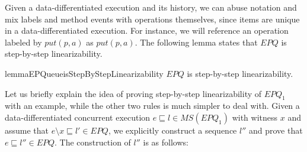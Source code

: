 Given a data-differentiated execution and its history, we can abuse notation and mix labels and method events with operations themselves, since items are unique in a data-differentiated execution. For instance, we will reference an operation labeled by $\textit{put}(p,a)$ as $\textit{put}(p,a)$. The following lemma states that $\textit{EPQ}$ is step-by-step linearizability.

\begin{restatable}{lemma}{EPQueueisStepByStepLinearizability}
\label{lemma:EPQ is step-by-step linearizability}
$\textit{EPQ}$ is step-by-step linearizability.
\end{restatable}

Let us briefly explain the idea of proving step-by-step linearizability of $\textit{EPQ}_1$ with an example, while the other two rules is much simpler to deal with. Given a data-differentiated concurrent execution $e \sqsubseteq l \in \textit{MS}(\textit{EPQ}_1)$ with witness $x$ and assume that $e \setminus x \sqsubseteq l' \in \textit{EPQ}$, we explicitly construct a sequence $l''$ and prove that $e \sqsubseteq l'' \in \textit{EPQ}$. The construction of $l''$ is as follows:

